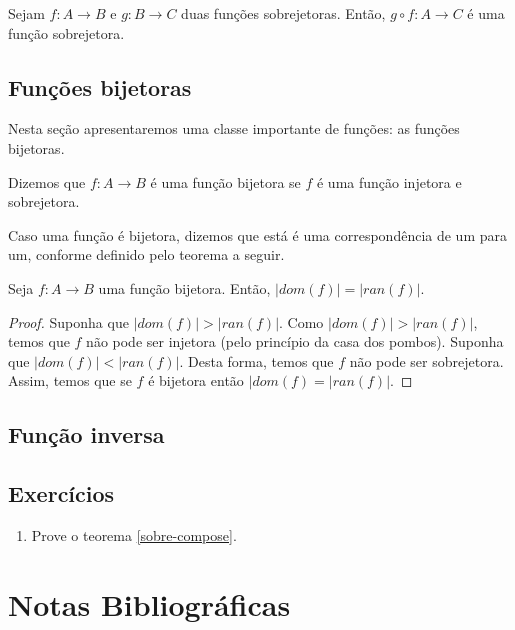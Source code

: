 \begin{Theorem}\label{sobre-compose}
Sejam $f : A \to B$ e $g : B \to C$ duas funções sobrejetoras. Então,
$g \circ f : A \to C$ é uma função sobrejetora.
\end{Theorem}

\subsection{Funções bijetoras}

Nesta seção apresentaremos uma classe importante de funções: as
funções bijetoras.

\begin{Definition}
Dizemos que $f : A \to B$ é uma função bijetora se $f$ é uma função
injetora e sobrejetora.
\end{Definition}

Caso uma função é bijetora, dizemos que está é uma correspondência de
um para um, conforme definido pelo teorema a seguir.

\begin{Theorem}
Seja $f : A \to B$ uma função bijetora. Então, $|dom(f)| = |ran(f)|$.
\end{Theorem}
\begin{proof}
Suponha que $|dom(f)| > |ran(f)|$. Como $|dom(f)| > |ran(f)|$, temos
que $f$ não pode ser injetora (pelo princípio da casa dos pombos).
Suponha que $|dom(f)| < |ran(f)|$. Desta forma, temos que
$f$ não pode ser sobrejetora. Assim, temos que se $f$ é bijetora então
$|dom(f) = |ran(f)|$.
\end{proof}

\subsection{Função inversa}


\subsection{Exercícios}

\begin{enumerate}
  \item Prove o teorema \ref{sobre-compose}.
\end{enumerate}

\section{Notas Bibliográficas}